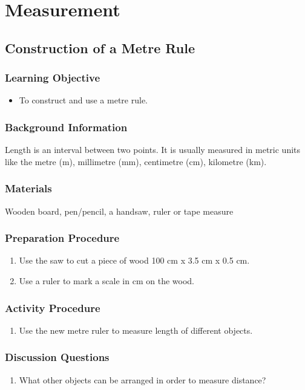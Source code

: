 \section{Measurement}	

\subsection{Construction of a Metre Rule}

\subsubsection*{Learning Objective}
\begin{itemize}
\item{To construct and use a metre rule.} 
\end{itemize}

\subsubsection*{Background Information}
Length is an interval between two points.  It is usually measured in metric units like the metre (m), millimetre (mm), centimetre (cm), kilometre (km).

\subsubsection*{Materials}
Wooden board, pen/pencil, a handsaw, ruler or tape measure

\subsubsection*{Preparation Procedure}
\begin{enumerate}
\item{Use the saw to cut a piece of wood 100 cm x 3.5 cm x 0.5 cm.} 
\item{Use a ruler to mark a scale in cm on the wood.} 
\end{enumerate}

\subsubsection*{Activity Procedure}
\begin{enumerate}
\item{Use the new metre ruler to measure length of different objects.} 
\end{enumerate}

\subsubsection*{Discussion Questions}
\begin{enumerate}
\item{What other objects can be arranged in order to measure distance?}
\end{enumerate}

